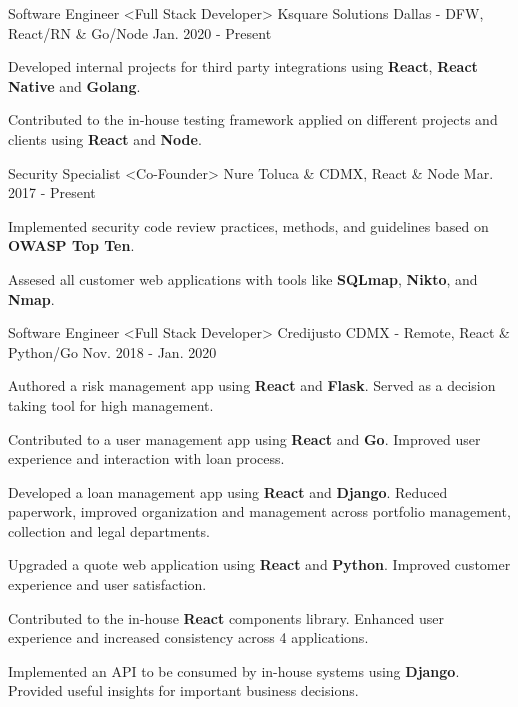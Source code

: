 \begin{cventries}
  \cventry
    {Software Engineer <Full Stack Developer>}
    {Ksquare Solutions}
    {Dallas - DFW, React/RN \& Go/Node}
    {Jan. 2020 - Present}
    {
      \begin{cvitems}
        \item {Developed internal projects for third party integrations using \textbf{React}, \textbf{React Native} and \textbf{Golang}.}
        \item {Contributed to the in-house testing framework applied on different projects and clients using \textbf{React} and \textbf{Node}.}
      \end{cvitems}
    }
  \cventry
    {Security Specialist <Co-Founder>}
    {Nure}
    {Toluca \& CDMX, React \& Node}
    {Mar. 2017 - Present}
    {
      \begin{cvitems}
        \item {Implemented security code review practices, methods, and guidelines based on \textbf{OWASP Top Ten}.}
         \item {Assesed all customer web applications with tools like \textbf{SQLmap}, \textbf{Nikto}, and \textbf{Nmap}.}
      \end{cvitems}
    }
  \cventry
    {Software Engineer <Full Stack Developer>}
    {Credijusto}
    {CDMX - Remote, React \& Python/Go}
    {Nov. 2018 - Jan. 2020}
    {
      \begin{cvitems}
        \item {Authored a risk management app using \textbf{React} and \textbf{Flask}. Served as a decision taking tool for high management.}
        \item {Contributed to a user management app using \textbf{React} and \textbf{Go}. Improved user experience and interaction with loan process.}
        \item {Developed a loan management app using \textbf{React} and \textbf{Django}. Reduced paperwork, improved organization and management across portfolio management, collection and legal departments.}
        \item {Upgraded a quote web application using \textbf{React} and \textbf{Python}. Improved customer experience and user satisfaction.}
        \item {Contributed to the in-house \textbf{React} components library. Enhanced user experience and increased consistency across 4 applications.}
        \item {Implemented an API to be consumed by  in-house systems using \textbf{Django}. Provided useful insights for important business decisions.}

\end{cvitems}}
\end{cventries}
